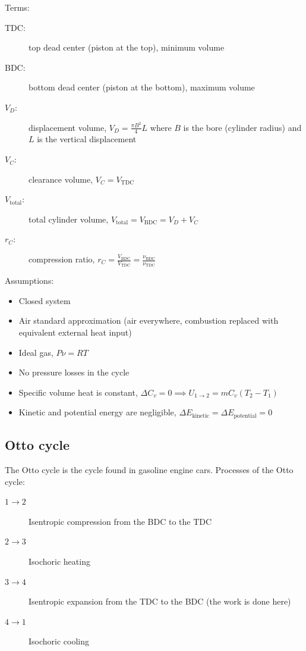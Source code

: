 \documentclass[10pt, twocolumn]{article}
\begin{document}
Terms:
\begin{description}
  \item[TDC:] top dead center (piston at the top), minimum volume
  \item[BDC:] bottom dead center (piston at the bottom), maximum volume
  \item[\(V_D\):] displacement volume, \(V_D = \frac{\pi B^2}{4}L\) where \(B\) is the bore (cylinder radius) and \(L\) is the vertical displacement
  \item[\(V_C\):] clearance volume, \(V_C = V_\mathrm{TDC}\)
  \item[\(V_\mathrm{total}\):] total cylinder volume, \(V_\mathrm{total} = V_\mathrm{BDC} = V_D + V_C\)
  \item[\(r_C\):] compression ratio, \(r_C = \frac{V_\mathrm{BDC}}{V_\mathrm{TDC}} = \frac{\nu_\mathrm{BDC}}{\nu_\mathrm{TDC}}\)
\end{description}


Assumptions:
\begin{itemize}
  \item Closed system
  \item Air standard approximation (air everywhere, combustion replaced with equivalent external heat input)
  \item Ideal gas, \(P \nu = RT\)
  \item No pressure losses in the cycle
  \item Specific volume heat is constant, \(\Delta C_v = 0 \implies U_{1 \to 2} = m C_v (T_2 - T_1)\)
  \item Kinetic and potential energy are negligible, \(\Delta E_\mathrm{kinetic} = \Delta E_\mathrm{potential} = 0\)
\end{itemize}


\subsection{Otto cycle}
The Otto cycle is the cycle found in gasoline engine cars.
Processes of the Otto cycle:
\begin{description}
  \item[\(1 \rightarrow 2\)] Isentropic compression from the BDC to the TDC
  \item[\(2 \rightarrow 3\)] Isochoric heating
  \item[\(3 \rightarrow 4\)] Isentropic expansion from the TDC to the BDC (the work is done here)
  \item[\(4 \rightarrow 1\)] Isochoric cooling
\end{description}
\end{document}
